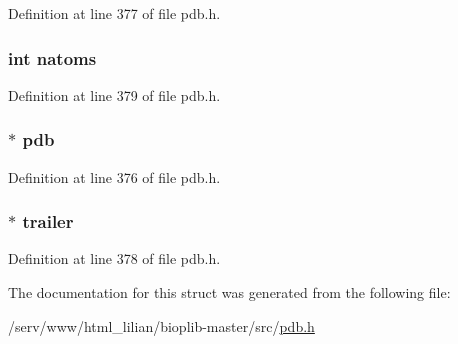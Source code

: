 Definition at line 377 of file pdb.\-h.

\hypertarget{struct__wholepdb_a2093ca3426a8f98873fe165a55bfa2b1}{
\subsubsection[{natoms}]{\setlength{\rightskip}{0pt plus 5cm}int natoms}}\label{struct__wholepdb_a2093ca3426a8f98873fe165a55bfa2b1}


Definition at line 379 of file pdb.\-h.

\hypertarget{struct__wholepdb_a9cac171f884f9ad8fd8dbb4d36b233a0}{
\subsubsection[{pdb}]{$\ast$ pdb}}\label{struct__wholepdb_a9cac171f884f9ad8fd8dbb4d36b233a0}


Definition at line 376 of file pdb.\-h.

\hypertarget{struct__wholepdb_a26b5f2516c2bf97f561791a89d1912e1}{
\subsubsection[{trailer}]{$\ast$ trailer}}\label{struct__wholepdb_a26b5f2516c2bf97f561791a89d1912e1}


Definition at line 378 of file pdb.\-h.



The documentation for this struct was generated from the following file\-:\begin{DoxyCompactItemize}
\item 
/serv/www/html\-\_\-lilian/bioplib-\/master/src/\hyperlink{pdb_8h}{pdb.\-h}\end{DoxyCompactItemize}
